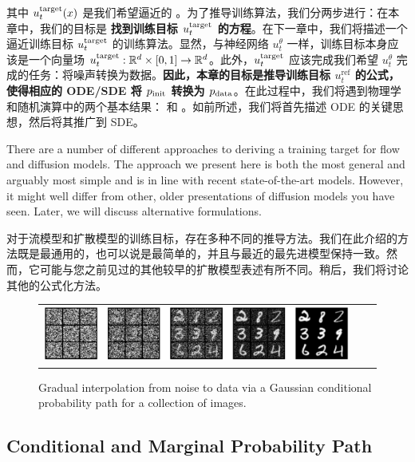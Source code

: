 其中 $u^{\text{target}}_t(x)$ 是我们希望逼近的 。为了推导训练算法，我们分两步进行：在本章中，我们的目标是 \textbf{找到训练目标 $u^{\text{target}}_t$ 的方程}。在下一章中，我们将描述一个逼近训练目标 $u^{\text{target}}_t$ 的训练算法。显然，与神经网络 $u_t^\theta$ 一样，训练目标本身应该是一个向量场 $u^{\text{target}}_t:\mathbb{R}^d\times[0,1]\to\mathbb{R}^d$。此外，$u^{\text{target}}_t$ 应该完成我们希望 $u_t^\theta$ 完成的任务：将噪声转换为数据。\textbf{因此，本章的目标是推导训练目标 $u_t^\text{ref}$ 的公式，使得相应的 ODE/SDE 将 $p_{\rm{init}}$ 转换为 $p_{\rm{data}}$}。在此过程中，我们将遇到物理学和随机演算中的两个基本结果： 和 。如前所述，我们将首先描述 ODE 的关键思想，然后将其推广到 SDE。

\begin{remarkbox}
There are a number of different approaches to deriving a training target for flow and diffusion models. The approach we present here is both the most general and arguably most simple and is in line with recent state-of-the-art models. However, it might well differ from other, older presentations of diffusion models you have seen. Later, we will discuss  alternative formulations.

对于流模型和扩散模型的训练目标，存在多种不同的推导方法。我们在此介绍的方法既是最通用的，也可以说是最简单的，并且与最近的最先进模型保持一致。然而，它可能与您之前见过的其他较早的扩散模型表述有所不同。稍后，我们将讨论其他的公式化方法。
\end{remarkbox}

\begin{figure}[h!]
    \centering
    \begin{tabular}{ccc}
         \includegraphics[width=\textwidth]{figures/noised_mnist_reversed.png} &
    \end{tabular}
    \caption{\label{fig:noising_image} Gradual interpolation from noise to data via  a Gaussian conditional probability path for a collection of images.}
\end{figure}

\subsection{Conditional and Marginal Probability Path}

